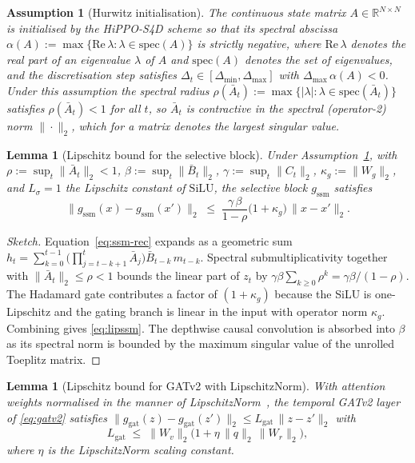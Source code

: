 \documentclass[journal,10pt,twocolumn]{IEEEtran}
\newtheorem{lemma}[theorem]{Lemma}
\newtheorem{assumption}[theorem]{Assumption}
\newcommand{\R}{\mathbb{R}}
\begin{document}
\begin{assumption}[Hurwitz initialisation]
\label{ass:hurwitz}
The continuous state matrix $A\in\R^{N\times N}$ is initialised by the HiPPO-S4D scheme so that its spectral abscissa $\alpha(A):=\max\{\mathrm{Re}\,\lambda:\lambda\in\mathrm{spec}(A)\}$ is strictly negative, where $\mathrm{Re}\,\lambda$ denotes the real part of an eigenvalue $\lambda$ of $A$ and $\mathrm{spec}(A)$ denotes the set of eigenvalues, and the discretisation step satisfies $\Delta_{t}\in[\Delta_{\min},\Delta_{\max}]$ with $\Delta_{\max}\,\alpha(A)<0$. Under this assumption the spectral radius $\rho(\bar A_{t}):=\max\{|\lambda|:\lambda\in\mathrm{spec}(\bar A_{t})\}$ satisfies $\rho(\bar A_{t})<1$ for all $t$, so $\bar A_{t}$ is contractive in the spectral (operator-2) norm $\|\cdot\|_{2}$, which for a matrix denotes the largest singular value.
\end{assumption}

\begin{lemma}[Lipschitz bound for the selective block]
\label{lem:lipssm}
Under Assumption~\ref{ass:hurwitz}, with $\rho:=\sup_{t}\|\bar A_{t}\|_{2}<1$, $\beta:=\sup_{t}\|\bar B_{t}\|_{2}$, $\gamma:=\sup_{t}\|C_{t}\|_{2}$, $\kappa_{g}:=\|W_{g}\|_{2}$, and $L_{\sigma}=1$ the Lipschitz constant of $\mathrm{SiLU}$, the selective block $g_{\text{ssm}}$ satisfies
\begin{equation}
\|g_{\text{ssm}}(x)-g_{\text{ssm}}(x')\|_{2} \;\le\; \frac{\gamma\,\beta}{1-\rho}\bigl(1+\kappa_{g}\bigr)\,\|x-x'\|_{2}.
\label{eq:lipssm}
\end{equation}
\end{lemma}

\begin{proof}[Sketch]
Equation~\eqref{eq:ssm-rec} expands as a geometric sum $h_{t}=\sum_{k=0}^{t-1}\bigl(\prod_{j=t-k+1}^{t}\bar A_{j}\bigr)\bar B_{t-k}\,m_{t-k}$. Spectral submultiplicativity together with $\|\bar A_{t}\|_{2}\le\rho<1$ bounds the linear part of $z_{t}$ by $\gamma\beta\sum_{k\ge 0}\rho^{k}=\gamma\beta/(1-\rho)$. The Hadamard gate contributes a factor of $(1+\kappa_{g})$ because the SiLU is one-Lipschitz and the gating branch is linear in the input with operator norm $\kappa_{g}$. Combining gives \eqref{eq:lipssm}. The depthwise causal convolution is absorbed into $\beta$ as its spectral norm is bounded by the maximum singular value of the unrolled Toeplitz matrix.
\end{proof}

\begin{lemma}[Lipschitz bound for GATv2 with LipschitzNorm]
\label{lem:lipgat}
With attention weights normalised in the manner of LipschitzNorm~\cite{Dasoulas2021LipNorm}, the temporal GATv2 layer of \eqref{eq:gatv2} satisfies $\|g_{\text{gat}}(z)-g_{\text{gat}}(z')\|_{2}\le L_{\text{gat}}\,\|z-z'\|_{2}$ with
\begin{equation}
L_{\text{gat}} \;\le\; \|W_{v}\|_{2}\bigl(1+\eta\,\|q\|_{2}\,\|W_{r}\|_{2}\bigr),
\label{eq:lipgat}
\end{equation}
where $\eta$ is the LipschitzNorm scaling constant.
\end{lemma}
\end{document}
